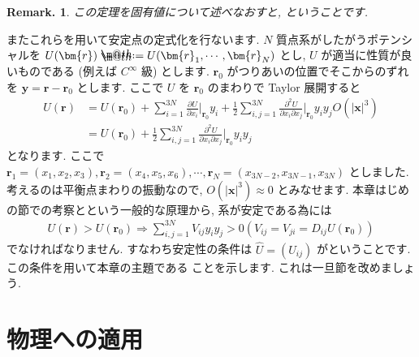\documentclass[openany, a4paper, oneside]{book}
\makeatletter
\newcommand*{\defeq}{\mathrel{\rlap{%
\raisebox{0.3ex}{$\m@th\cdot$}}%
\raisebox{-0.3ex}{$\m@th\cdot$}}%
=}
\theoremstyle{break}
\theoremstyle{breakdefn}
\newtheorem{rem}[thm]{Remark.}
\makeatother
\begin{document}
\begin{rem}
この定理を固有値について述べなおすと,
ということです.
\label{rem:3.1}
\end{rem}

またこれらを用いて安定点の定式化を行ないます.
$N$ 質点系がしたがうポテンシャルを $U (\bm{r}) \defeq U ( \bm{r}_1,\dotsb,\bm{r}_N)$ とし,
$U$ が適当に性質が良いものである (例えば $C^{\infty}$ 級) とします.
$\bm{r}_0$ がつりあいの位置でそこからのずれを $\bm{y} = \bm{r} - \bm{r}_0$ とします.
ここで $U$ を $\bm{r}_0$ のまわりで Taylor 展開すると
\begin{align}
U ( \bm{r} )
&=
U ( \bm{r}_0 ) + \sum_{i=1}^{3N} \frac{\partial U} {\partial x_i} \bigg|_{\bm{r}_0} y_i
+\frac{1} {2} \sum_{i,j=1}^{3N} \frac{\partial^2 U} {\partial x_i \partial x_j}\bigg|_{\bm{r}_0} y_i y_j
O ( |\bm{x}|^3)\\
&=
U ( \bm{r}_0 ) + \frac{1} {2} \sum_{i,j=1}^{3N} \frac{\partial^2 U} {\partial x_i \partial x_j}\bigg|_{\bm{r}_0} y_i y_j
\end{align}
となります.
ここで $\bm{r}_1=(x_1,x_2,x_3),\bm{r}_2=(x_4,x_5,x_6),\dotsb,\bm{r}_N=(x_{3N-2},x_{3N-1},x_{3N})$ としました.
考えるのは平衡点まわりの振動なので,  $O ( |\bm{x}|^3) \approx 0$ とみなせます.
本章はじめの節での考察とという一般的な原理から,
系が安定である為には
\begin{align}
U ( \bm{r} )
>
U ( \bm{r}_0 )
\Longrightarrow \sum_{i,j=1}^{3N} V_{ij} y_i y_j > 0
\left ( V_{ij} = V_{ji} = D_{ij} U ( {\bm{r}_0}) \right)
\end{align}
でなければなりません.
すなわち安定性の条件は
 $\hat{U} = ( U_{ij})$ がということです.
この条件を用いて本章の主題である
ことを示します.
これは一旦節を改めましょう.
\section{物理への適用}
\label{sec-5-2-10}
\end{document}
